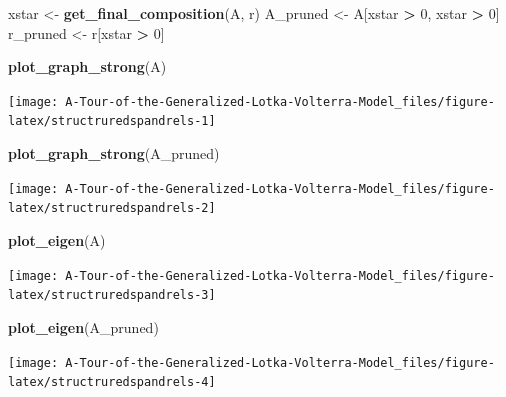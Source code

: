 \documentclass[]{book}
\newenvironment{Shaded}{\begin{snugshade}}{\end{snugshade}}
\newcommand{\DecValTok}[1]{\textcolor[rgb]{0.00,0.00,0.81}{#1}}
\newcommand{\KeywordTok}[1]{\textcolor[rgb]{0.13,0.29,0.53}{\textbf{#1}}}
\newcommand{\NormalTok}[1]{#1}
\newcommand{\OperatorTok}[1]{\textcolor[rgb]{0.81,0.36,0.00}{\textbf{#1}}}
\newcommand{\StringTok}[1]{\textcolor[rgb]{0.31,0.60,0.02}{#1}}
\begin{document}
\begin{Shaded}
\begin{Highlighting}[]
\NormalTok{xstar <-}\StringTok{ }\KeywordTok{get_final_composition}\NormalTok{(A, r)}
\NormalTok{A_pruned <-}\StringTok{ }\NormalTok{A[xstar }\OperatorTok{>}\StringTok{ }\DecValTok{0}\NormalTok{, xstar }\OperatorTok{>}\StringTok{ }\DecValTok{0}\NormalTok{]}
\NormalTok{r_pruned <-}\StringTok{ }\NormalTok{r[xstar }\OperatorTok{>}\StringTok{ }\DecValTok{0}\NormalTok{]}

\KeywordTok{plot_graph_strong}\NormalTok{(A)}
\end{Highlighting}
\end{Shaded}

\begin{center}\texttt{[image: A-Tour-of-the-Generalized-Lotka-Volterra-Model\_files/figure-latex/structruredspandrels-1]} \end{center}

\begin{Shaded}
\begin{Highlighting}[]
\KeywordTok{plot_graph_strong}\NormalTok{(A_pruned)}
\end{Highlighting}
\end{Shaded}

\begin{center}\texttt{[image: A-Tour-of-the-Generalized-Lotka-Volterra-Model\_files/figure-latex/structruredspandrels-2]} \end{center}

\begin{Shaded}
\begin{Highlighting}[]
\KeywordTok{plot_eigen}\NormalTok{(A)}
\end{Highlighting}
\end{Shaded}

\begin{center}\texttt{[image: A-Tour-of-the-Generalized-Lotka-Volterra-Model\_files/figure-latex/structruredspandrels-3]} \end{center}

\begin{Shaded}
\begin{Highlighting}[]
\KeywordTok{plot_eigen}\NormalTok{(A_pruned)}
\end{Highlighting}
\end{Shaded}

\begin{center}\texttt{[image: A-Tour-of-the-Generalized-Lotka-Volterra-Model\_files/figure-latex/structruredspandrels-4]} \end{center}
\end{document}
